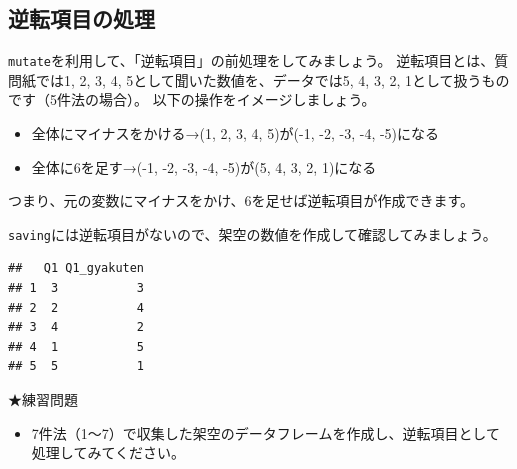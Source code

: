 \documentclass[]{book}
\newenvironment{Shaded}{\begin{snugshade}}{\end{snugshade}}
\newcommand{\KeywordTok}[1]{\textcolor[rgb]{0.13,0.29,0.53}{\textbf{#1}}}
\newcommand{\DataTypeTok}[1]{\textcolor[rgb]{0.13,0.29,0.53}{#1}}
\newcommand{\DecValTok}[1]{\textcolor[rgb]{0.00,0.00,0.81}{#1}}
\newcommand{\StringTok}[1]{\textcolor[rgb]{0.31,0.60,0.02}{#1}}
\newcommand{\CommentTok}[1]{\textcolor[rgb]{0.56,0.35,0.01}{\textit{#1}}}
\newcommand{\OperatorTok}[1]{\textcolor[rgb]{0.81,0.36,0.00}{\textbf{#1}}}
\newcommand{\NormalTok}[1]{#1}
\providecommand{\tightlist}{%
  \setlength{\itemsep}{0pt}\setlength{\parskip}{0pt}}
\begin{document}
\subsection{逆転項目の処理}\label{ux9006ux8ee2ux9805ux76eeux306eux51e6ux7406}

\texttt{mutate}を利用して、「逆転項目」の前処理をしてみましょう。
逆転項目とは、質問紙では1, 2, 3, 4, 5として聞いた数値を、データでは5, 4,
3, 2, 1として扱うものです（5件法の場合）。
以下の操作をイメージしましょう。

\begin{itemize}
\tightlist
\item
  全体にマイナスをかける→(1, 2, 3, 4, 5)が(-1, -2, -3, -4, -5)になる
\item
  全体に6を足す→(-1, -2, -3, -4, -5)が(5, 4, 3, 2, 1)になる
\end{itemize}

つまり、元の変数にマイナスをかけ、6を足せば逆転項目が作成できます。

\texttt{saving}には逆転項目がないので、架空の数値を作成して確認してみましょう。

\begin{Shaded}
\end{Shaded}

\begin{verbatim}
##   Q1 Q1_gyakuten
## 1  3           3
## 2  2           4
## 3  4           2
## 4  1           5
## 5  5           1
\end{verbatim}

★練習問題

\begin{itemize}
\tightlist
\item
  7件法（1〜7）で収集した架空のデータフレームを作成し、逆転項目として処理してみてください。
\end{itemize}
\end{document}
